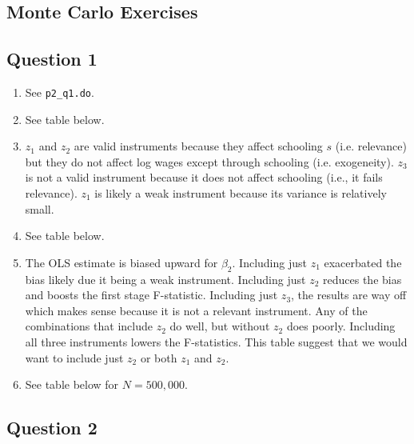 \documentclass{article}
\begin{document}
\begin{landscape}

\section{Monte Carlo Exercises}

\subsection{Question 1}

\begin{enumerate}

\item See \texttt{p2\_q1.do}.

\item See table below.

\item  $z_1$ and $z_2$ are valid instruments because they affect schooling $s$ (i.e. relevance) but they do not affect log wages except through schooling (i.e. exogeneity). $z_3$ is not a valid instrument because it does not affect schooling (i.e., it fails relevance). $z_1$ is likely a weak instrument because its variance is relatively small.

\item See table below.



\item The OLS estimate is biased upward for $\beta_2$.  Including just $z_1$ exacerbated the bias likely due it being a weak instrument. Including just $z_2$ reduces the bias and boosts the first stage F-statistic. Including just $z_3$, the results are way off which makes sense because it is not a relevant instrument. Any of the combinations that include $z_2$ do well, but without $z_2$ does poorly. Including all three instruments lowers the F-statistics.  This table suggest that we would want to include just $z_2$ or both $z_1$ and $z_2$.

\pagebreak

\item See table below for $N = 500,000$.



\end{enumerate}

\end{landscape}

\subsection{Question 2}
\end{document}
